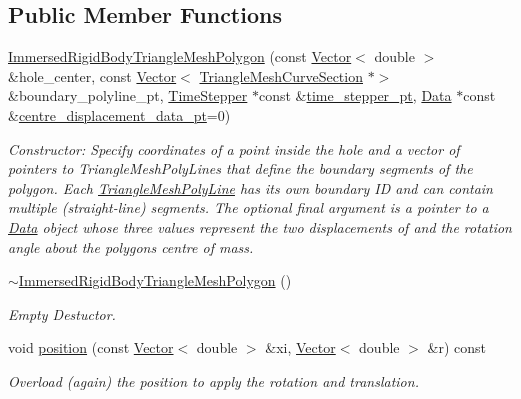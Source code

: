 \subsection*{Public Member Functions}
\begin{DoxyCompactItemize}
\item 
\hyperlink{classoomph_1_1ImmersedRigidBodyTriangleMeshPolygon_a048f25b4b6b89a1f992e491d9f3aa75f}{Immersed\+Rigid\+Body\+Triangle\+Mesh\+Polygon} (const \hyperlink{classoomph_1_1Vector}{Vector}$<$ double $>$ \&hole\+\_\+center, const \hyperlink{classoomph_1_1Vector}{Vector}$<$ \hyperlink{classoomph_1_1TriangleMeshCurveSection}{Triangle\+Mesh\+Curve\+Section} $\ast$$>$ \&boundary\+\_\+polyline\+\_\+pt, \hyperlink{classoomph_1_1TimeStepper}{Time\+Stepper} $\ast$const \&\hyperlink{classoomph_1_1GeomObject_a3c92023891dd4a0e818022f467eeb7f1}{time\+\_\+stepper\+\_\+pt}, \hyperlink{classoomph_1_1Data}{Data} $\ast$const \&\hyperlink{classoomph_1_1ImmersedRigidBodyElement_ac1e912d596869720566ab2264aa60d6c}{centre\+\_\+displacement\+\_\+data\+\_\+pt}=0)
\begin{DoxyCompactList}\small\item\em Constructor\+: Specify coordinates of a point inside the hole and a vector of pointers to Triangle\+Mesh\+Poly\+Lines that define the boundary segments of the polygon. Each \hyperlink{classoomph_1_1TriangleMeshPolyLine}{Triangle\+Mesh\+Poly\+Line} has its own boundary ID and can contain multiple (straight-\/line) segments. The optional final argument is a pointer to a \hyperlink{classoomph_1_1Data}{Data} object whose three values represent the two displacements of and the rotation angle about the polygon\textquotesingle{}s centre of mass. \end{DoxyCompactList}\item 
\hyperlink{classoomph_1_1ImmersedRigidBodyTriangleMeshPolygon_aae9a79d69a367e1f552a91454c448289}{$\sim$\+Immersed\+Rigid\+Body\+Triangle\+Mesh\+Polygon} ()
\begin{DoxyCompactList}\small\item\em Empty Destuctor. \end{DoxyCompactList}\item 
void \hyperlink{classoomph_1_1ImmersedRigidBodyTriangleMeshPolygon_a29e3518f6fcdaeead14ae41f11e6fb5d}{position} (const \hyperlink{classoomph_1_1Vector}{Vector}$<$ double $>$ \&xi, \hyperlink{classoomph_1_1Vector}{Vector}$<$ double $>$ \&r) const
\begin{DoxyCompactList}\small\item\em Overload (again) the position to apply the rotation and translation. \end{DoxyCompactList}\item 
$$
\end{DoxyCompactItemize}
